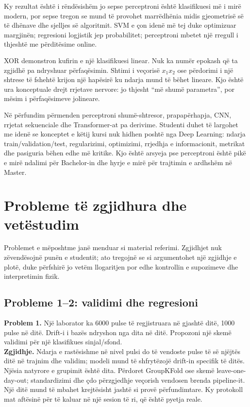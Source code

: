 \documentclass[12pt,a4paper,oneside]{book}
\begin{document}
Ky rezultat është i rëndësishëm jo sepse perceptroni është klasifikuesi më i mirë modern, por sepse tregon se mund të provohet marrëdhënia midis gjeometrisë së të dhënave dhe sjelljes së algoritmit. SVM e çon idenë më tej duke optimizuar margjinën; regresioni logjistik jep probabilitet; perceptroni mbetet një rregull i thjeshtë me përditësime online.

XOR demonstron kufirin e një klasifikuesi linear. Nuk ka numër epokash që ta zgjidhë pa ndryshuar përfaqësimin. Shtimi i veçorisë $x_1x_2$ ose përdorimi i një shtrese të fshehtë krijon një hapësirë ku ndarja mund të bëhet lineare. Kjo është ura konceptuale drejt rrjetave nervore: jo thjesht “më shumë parametra”, por mësim i përfaqësimeve jolineare.

Në përfundim përmenden perceptroni shumë-shtresor, prapapërhapja, CNN, rrjetat sekuenciale dhe Transformer-at pa derivime. Studenti duhet të largohet me idenë se konceptet e këtij kursi nuk hidhen poshtë nga Deep Learning: ndarja train/validation/test, regularizimi, optimizimi, rrjedhja e informacionit, metrikat dhe pasiguria bëhen edhe më kritike. Kjo është arsyeja pse perceptroni është pikë e mirë ndalimi për Bachelor-in dhe hyrje e mirë për trajtimin e ardhshëm në Master.

\chapter[Probleme të zgjidhura]{Probleme të zgjidhura dhe vetëstudim}
Problemet e mëposhtme janë menduar si material referimi. Zgjidhjet nuk zëvendësojnë punën e studentit; ato tregojnë se si argumentohet një zgjidhje e plotë, duke përfshirë jo vetëm llogaritjen por edhe kontrollin e supozimeve dhe interpretimin fizik.

\section{Probleme 1--2: validimi dhe regresioni}
\textbf{Problem 1.} Një laborator ka 6000 pulse të regjistruara në gjashtë ditë, 1000 pulse në ditë. Drift-i i bazës ndryshon nga dita në ditë. Propozoni një skemë validimi për një klasifikues sinjal/sfond.\\
\textbf{Zgjidhje.} Ndarja e rastësishme në nivel pulsi do të vendoste pulse të së njëjtës ditë në trajnim dhe validim; modeli mund të shfrytëzojë drift-in specifik të ditës. Njësia natyrore e grupimit është dita. Përdoret GroupKFold ose skemë leave-one-day-out; standardizimi dhe çdo përzgjedhje veçorish vendosen brenda pipeline-it. Një ditë mund të mbahet krejtësisht jashtë si provë përfundimtare. Ky protokoll mat aftësinë për të kaluar në një sesion të ri, që është pyetja reale.
\end{document}
